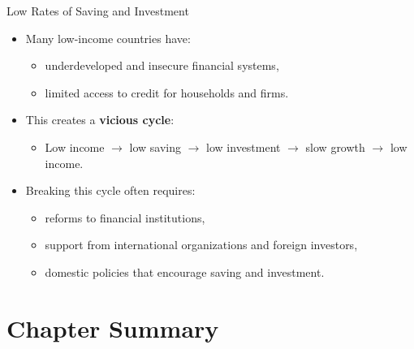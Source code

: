 \documentclass[aspectratio=169]{beamer}
\begin{document}
\begin{frame}{Low Rates of Saving and Investment}
\transfade
\begin{itemize}[<+->]
  \item Many low-income countries have:
  \begin{itemize}[<+->]
    \item underdeveloped and insecure financial systems,
    \item limited access to credit for households and firms.
  \end{itemize}
  \item This creates a \textbf{vicious cycle}:
  \begin{itemize}[<+->]
    \item Low income \(\rightarrow\) low saving \(\rightarrow\) low investment \(\rightarrow\) slow growth \(\rightarrow\) low income.
  \end{itemize}
  \item Breaking this cycle often requires:
  \begin{itemize}[<+->]
    \item reforms to financial institutions,
    \item support from international organizations and foreign investors,
    \item domestic policies that encourage saving and investment.
  \end{itemize}
\end{itemize}
\end{frame}

\section*{Chapter Summary}
\end{document}
